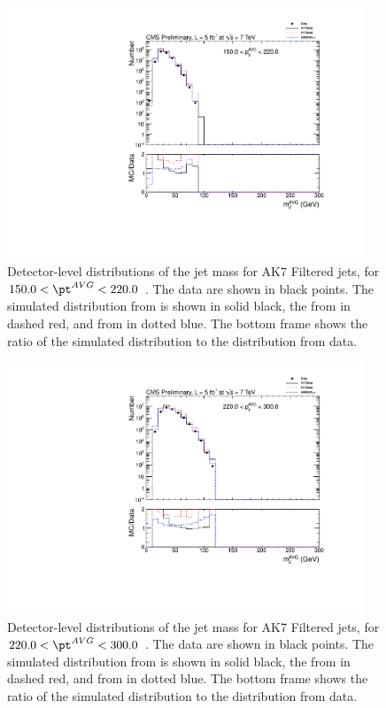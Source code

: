 \ifnpas

\begin{figure}[htbp]
\centering
\includegraphics[width=0.95\textwidth]{figs/histAK7MjetVsPtAvg_rawDataMCComparisons_pt_3_Filtered}
\caption{Detector-level distributions of the jet mass for AK7 Filtered jets,
for $150.0 < \pt^{AVG} < 220.0$ \GeVc. The data are shown in black points.
The simulated distribution from \PYTHIA is shown in solid black, 
the from \PYTHIAEIGHT in dashed red, and from \HERWIG in dotted blue. 
The bottom frame shows the ratio of the simulated distribution
to the distribution from data. 
\label{figs:histAK7MjetVsPtAvg_rawDataMCComparisons_pt_3_Filtered}}
\end{figure}



\begin{figure}[htbp]
\centering
\includegraphics[width=0.95\textwidth]{figs/histAK7MjetVsPtAvg_rawDataMCComparisons_pt_4_Filtered}
\caption{Detector-level distributions of the jet mass for AK7 Filtered jets,
for $220.0 < \pt^{AVG} < 300.0$ \GeVc. The data are shown in black points.
The simulated distribution from \PYTHIA is shown in solid black, 
the from \PYTHIAEIGHT in dashed red, and from \HERWIG in dotted blue. 
The bottom frame shows the ratio of the simulated distribution
to the distribution from data. 
\label{figs:histAK7MjetVsPtAvg_rawDataMCComparisons_pt_4_Filtered}}
\end{figure}



